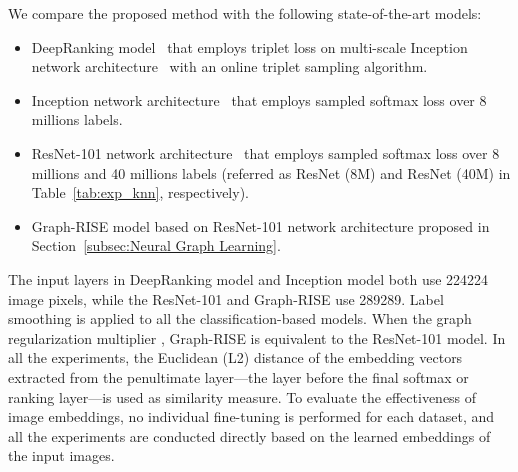 \documentclass[sigconf]{acmart}
\begin{document}
We compare the proposed method with the following state-of-the-art models: 
\begin{itemize}
    \item DeepRanking model~\cite{wang2014learning} that employs triplet loss on multi-scale Inception network architecture~\cite{szegedy2016rethinking} with an online triplet sampling algorithm. 
    \item Inception network architecture~\cite{szegedy2016rethinking} that employs sampled softmax loss over 8 millions labels.
    \item ResNet-101 network architecture~\cite{he2016deep} that employs sampled softmax loss over 8 millions and 40 millions labels (referred as ResNet (8M) and ResNet (40M) in Table~\ref{tab:exp_knn}, respectively). 
    \item Graph-RISE model based on ResNet-101 network architecture proposed in Section~\ref{subsec:Neural Graph Learning}. 
\end{itemize}
The input layers in DeepRanking model and Inception model both use 224224 image pixels, while the ResNet-101 and Graph-RISE use 289289. Label smoothing is applied to all the classification-based models. When the graph regularization multiplier , Graph-RISE is equivalent to the ResNet-101 model. In all the experiments, the Euclidean (L2) distance of the embedding vectors extracted from the penultimate layer---the layer before the final softmax or ranking layer---is used as similarity measure. To evaluate the effectiveness of image embeddings, no individual fine-tuning is performed for each dataset, and all the experiments are conducted directly based on the learned embeddings of the input images.
\end{document}

